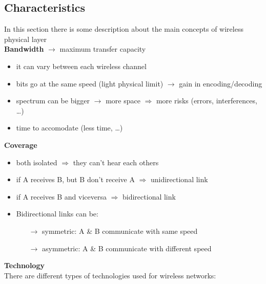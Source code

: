 \subsection{Characteristics}
In this section there is some description about the main concepts of wireless\\physical layer\\[0.5cm]
\textbf{Bandwidth} $\rightarrow$ maximum transfer capacity
\begin{itemize}
    \item it can vary between each wireless channel
    \item bits go at the same speed (light physical limit) $\rightarrow$
    gain in encoding/decoding
    \item spectrum can be bigger $\rightarrow$ more space $\Rightarrow$
    more risks (errors, interferences, \dots)
    \item time to accomodate (less time, \dots)
\end{itemize}
\vspace{1em}
\textbf{Coverage}
\begin{itemize}
    \item both isolated $\Rightarrow$ they can't hear each others
    \item if A receives B, but B don't receive A $\Rightarrow$ unidirectional link
    \item if A receives B and viceversa $\Rightarrow$ bidirectional link
    \item Bidirectional links can be:
    \begin{itemize}
        \item[$\rightarrow$] symmetric: A \& B communicate with same speed
        \item[$\rightarrow$] asymmetric: A \& B communicate with different speed
    \end{itemize}
\end{itemize}
\vspace{1em}
\textbf{Technology}\\[0.2cm]
There are different types of technologies used for wireless networks:
